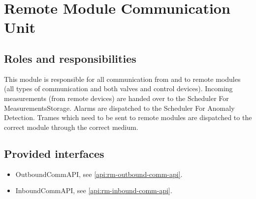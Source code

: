 \section{Remote Module Communication Unit}
\label{element:rm-comm-unit}

\subsection{Roles and responsibilities}

\npar This module is responsible for all communication from and to remote
modules (all types of communication and both valves and control devices).
Incoming measurements (from remote devices) are handed over to the Scheduler For
MeasurementsStorage. Alarms are dispatched to the Scheduler For Anomaly
Detection. Trames which need to be sent to remote modules are dispatched to the
correct module through the correct medium.

\subsection{Provided interfaces}

\begin{itemize}
  \item OutboundCommAPI, see \ref{api:rm-outbound-comm-api}.
  \item InboundCommAPI, see \ref{api:rm-inbound-comm-api}.
\end{itemize}



